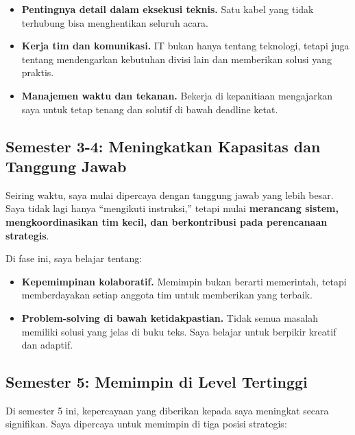 \documentclass[
  letterpaper,
  DIV=11,
  numbers=noendperiod]{scrreprt}
\providecommand{\tightlist}{%
  \setlength{\itemsep}{0pt}\setlength{\parskip}{0pt}}
\begin{document}
\begin{itemize}
\tightlist
\item
  \textbf{Pentingnya detail dalam eksekusi teknis.} Satu kabel yang
  tidak terhubung bisa menghentikan seluruh acara.
\item
  \textbf{Kerja tim dan komunikasi.} IT bukan hanya tentang teknologi,
  tetapi juga tentang mendengarkan kebutuhan divisi lain dan memberikan
  solusi yang praktis.
\item
  \textbf{Manajemen waktu dan tekanan.} Bekerja di kepanitiaan
  mengajarkan saya untuk tetap tenang dan solutif di bawah deadline
  ketat.
\end{itemize}

\subsection{\texorpdfstring{\textbf{Semester 3-4: Meningkatkan Kapasitas
dan Tanggung
Jawab}}{Semester 3-4: Meningkatkan Kapasitas dan Tanggung Jawab}}\label{semester-3-4-meningkatkan-kapasitas-dan-tanggung-jawab}

Seiring waktu, saya mulai dipercaya dengan tanggung jawab yang lebih
besar. Saya tidak lagi hanya ``mengikuti instruksi,'' tetapi mulai
\textbf{merancang sistem, mengkoordinasikan tim kecil, dan berkontribusi
pada perencanaan strategis}.

Di fase ini, saya belajar tentang:

\begin{itemize}
\tightlist
\item
  \textbf{Kepemimpinan kolaboratif.} Memimpin bukan berarti memerintah,
  tetapi memberdayakan setiap anggota tim untuk memberikan yang terbaik.
\item
  \textbf{Problem-solving di bawah ketidakpastian.} Tidak semua masalah
  memiliki solusi yang jelas di buku teks. Saya belajar untuk berpikir
  kreatif dan adaptif.
\end{itemize}

\subsection{\texorpdfstring{\textbf{Semester 5: Memimpin di Level
Tertinggi}}{Semester 5: Memimpin di Level Tertinggi}}\label{semester-5-memimpin-di-level-tertinggi}

Di semester 5 ini, kepercayaan yang diberikan kepada saya meningkat
secara signifikan. Saya dipercaya untuk memimpin di tiga posisi
strategis:
\end{document}
